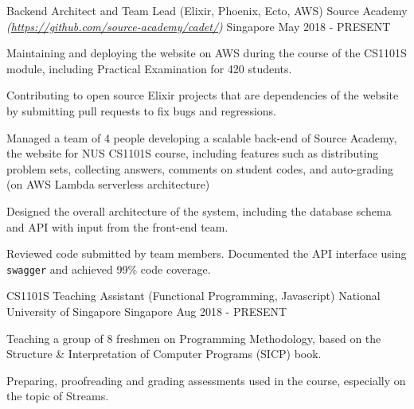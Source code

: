 \begin{cventries}
	\cventry
		{Backend Architect and Team Lead (Elixir, Phoenix, Ecto, AWS)} %
		{Source Academy \textmd{\em\tiny(\url{https://github.com/source-academy/cadet/})}} %
		{Singapore} %
		{May 2018 - PRESENT} %
		{
			\begin{cvitems}
				\item {Maintaining and deploying the website on AWS during the course of the CS1101S module, including Practical Examination for 420 students.}
        \item {Contributing to open source Elixir projects that are dependencies of the website by submitting pull requests to fix bugs and regressions.}
				\item {Managed a team of 4 people developing a scalable back-end of Source Academy, the website for NUS CS1101S course, including features such as distributing problem sets, collecting answers, comments on student codes, and auto-grading (on AWS Lambda serverless architecture)}
				\item {Designed the overall architecture of the system, including the database schema and API with input from the front-end team.}
				\item {Reviewed code submitted by team members. Documented the API interface using \texttt{swagger} and achieved 99\% code coverage.}
			\end{cvitems}
		}
	\cventry
		{CS1101S Teaching Assistant (Functional Programming, Javascript)} %
		{National University of Singapore} %
		{Singapore} %
		{Aug 2018 - PRESENT} %
		{
			\begin{cvitems}
				\item {Teaching a group of 8 freshmen on Programming Methodology, based on the Structure \& Interpretation of Computer Programs (SICP) book.}
				\item {Preparing, proofreading and grading assessments used in the course, especially on the topic of Streams.}
			\end{cvitems}
		}

\end{cventries}
